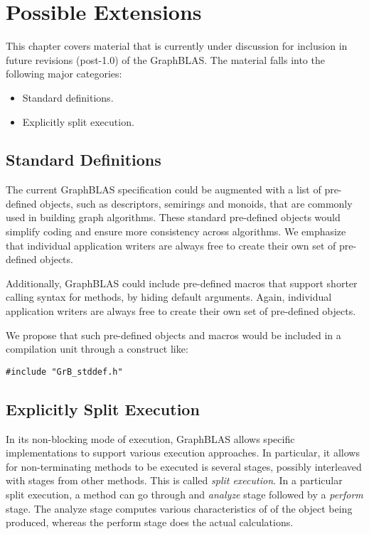 \chapter{Possible Extensions}

This chapter covers material that is currently under discussion for inclusion in 
future revisions (post-1.0) of the GraphBLAS. The material falls into the
following major categories:

\begin{itemize}
\item Standard definitions.
\item Explicitly split execution.
\end{itemize}

\section{Standard Definitions}

The current GraphBLAS specification could be augmented with a list of 
pre-defined objects, such as descriptors, semirings and monoids, that are commonly used
in building graph algorithms. These standard pre-defined objects would
simplify coding and ensure more consistency across algorithms. 
We emphasize
that individual application writers are always free to create their own set of
pre-defined objects.

Additionally, GraphBLAS could include pre-defined macros that support
shorter calling syntax for methods, by hiding default arguments. 
Again, individual application writers are always free to create their
own set of pre-defined objects.

We propose that such pre-defined objects and macros would
be included in a compilation unit through a construct like:

\begin{verbatim}
#include "GrB_stddef.h"
\end{verbatim}

\section{Explicitly Split Execution}

In its non-blocking mode of execution, GraphBLAS allows specific implementations to support
various execution approaches. In particular, it allows for non-terminating methods to be 
executed is several stages, possibly interleaved with stages from other methods. This is called \emph{split execution}. In a particular split execution,
a method can go through and \emph{analyze} stage followed by a \emph{perform} stage.
The analyze stage computes various characteristics of of the object being produced, whereas the
perform stage does the actual calculations.

